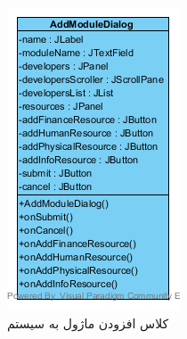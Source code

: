 \begin{figure}[H]
\begin{subfigure}[b]{0.3\textwidth}
	\includegraphics[width=\textwidth]{img/class-design/ui/AddModuleDialog.png}
	\caption{کلاس افزودن ماژول به سیستم}	
	\end{subfigure}
	\begin{subfigure}[b]{0.3\textwidth}

\end{subfigure}
\end{figure}
